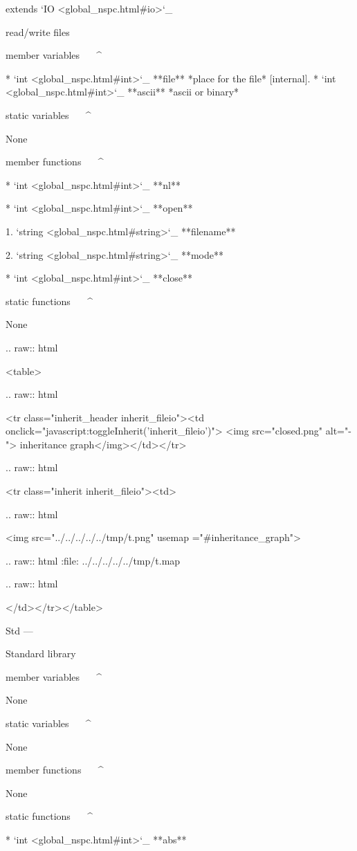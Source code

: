extends `IO <global_nspc.html#io>`_ 

read/write files

member variables
^^^^^^^^^^^^^^^^

	* `int <global_nspc.html#int>`_ **file** *place for the file*  [internal].
	* `int <global_nspc.html#int>`_ **ascii** *ascii or binary* 


static variables
^^^^^^^^^^^^^^^^

	None

member functions
^^^^^^^^^^^^^^^^

	* `int <global_nspc.html#int>`_ **nl**

	* `int <global_nspc.html#int>`_ **open**

		1. `string <global_nspc.html#string>`_ **filename**

		2. `string <global_nspc.html#string>`_ **mode**

	* `int <global_nspc.html#int>`_ **close**

static functions
^^^^^^^^^^^^^^^^


	None


  .. raw:: html

   <table>


  .. raw:: html

   <tr class="inherit_header inherit_fileio"><td onclick="javascript:toggleInherit('inherit_fileio')"> <img src="closed.png" alt="-"> inheritance graph</img></td></tr>


  .. raw:: html

   <tr class="inherit inherit_fileio"><td>


  .. raw:: html

   <img src="../../../../../tmp/t.png" usemap ="#inheritance_graph">


  .. raw:: html
   :file:   ../../../../../tmp/t.map


  .. raw:: html

   </td></tr></table>

Std
---

Standard library

member variables
^^^^^^^^^^^^^^^^

	None

static variables
^^^^^^^^^^^^^^^^

	None

member functions
^^^^^^^^^^^^^^^^


	None

static functions
^^^^^^^^^^^^^^^^

	* `int <global_nspc.html#int>`_ **abs**

